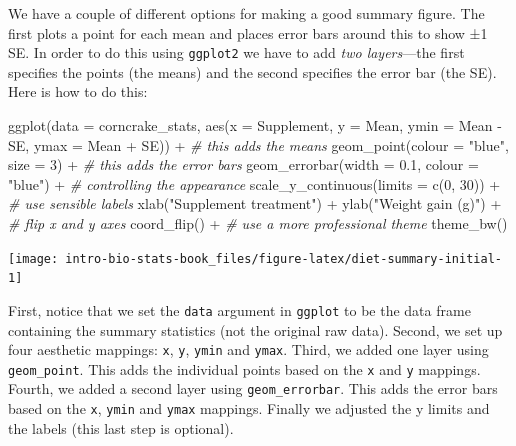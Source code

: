 \documentclass[
]{book}
\newenvironment{Shaded}{\begin{snugshade}}{\end{snugshade}}
\newcommand{\AttributeTok}[1]{\textcolor[rgb]{0.77,0.63,0.00}{#1}}
\newcommand{\CommentTok}[1]{\textcolor[rgb]{0.56,0.35,0.01}{\textit{#1}}}
\newcommand{\DecValTok}[1]{\textcolor[rgb]{0.00,0.00,0.81}{#1}}
\newcommand{\FloatTok}[1]{\textcolor[rgb]{0.00,0.00,0.81}{#1}}
\newcommand{\FunctionTok}[1]{\textcolor[rgb]{0.00,0.00,0.00}{#1}}
\newcommand{\NormalTok}[1]{#1}
\newcommand{\SpecialCharTok}[1]{\textcolor[rgb]{0.00,0.00,0.00}{#1}}
\newcommand{\StringTok}[1]{\textcolor[rgb]{0.31,0.60,0.02}{#1}}
\begin{document}
We have a couple of different options for making a good summary figure. The first plots a point for each mean and places error bars around this to show ±1 SE. In order to do this using \texttt{ggplot2} we have to add \emph{two layers}---the first specifies the points (the means) and the second specifies the error bar (the SE). Here is how to do this:

\begin{Shaded}
\begin{Highlighting}[]
\FunctionTok{ggplot}\NormalTok{(}\AttributeTok{data =}\NormalTok{ corncrake\_stats, }
       \FunctionTok{aes}\NormalTok{(}\AttributeTok{x =}\NormalTok{ Supplement, }\AttributeTok{y =}\NormalTok{ Mean, }\AttributeTok{ymin =}\NormalTok{ Mean }\SpecialCharTok{{-}}\NormalTok{ SE, }\AttributeTok{ymax =}\NormalTok{ Mean }\SpecialCharTok{+}\NormalTok{ SE)) }\SpecialCharTok{+} 
  \CommentTok{\# this adds the means}
  \FunctionTok{geom\_point}\NormalTok{(}\AttributeTok{colour =} \StringTok{"blue"}\NormalTok{, }\AttributeTok{size =} \DecValTok{3}\NormalTok{) }\SpecialCharTok{+} 
  \CommentTok{\# this adds the error bars}
  \FunctionTok{geom\_errorbar}\NormalTok{(}\AttributeTok{width =} \FloatTok{0.1}\NormalTok{, }\AttributeTok{colour =} \StringTok{"blue"}\NormalTok{) }\SpecialCharTok{+} 
  \CommentTok{\# controlling the appearance}
  \FunctionTok{scale\_y\_continuous}\NormalTok{(}\AttributeTok{limits =} \FunctionTok{c}\NormalTok{(}\DecValTok{0}\NormalTok{, }\DecValTok{30}\NormalTok{)) }\SpecialCharTok{+} 
  \CommentTok{\# use sensible labels}
  \FunctionTok{xlab}\NormalTok{(}\StringTok{"Supplement treatment"}\NormalTok{) }\SpecialCharTok{+} \FunctionTok{ylab}\NormalTok{(}\StringTok{"Weight gain (g)"}\NormalTok{) }\SpecialCharTok{+}
  \CommentTok{\# flip x and y axes}
  \FunctionTok{coord\_flip}\NormalTok{() }\SpecialCharTok{+}
  \CommentTok{\# use a more professional theme}
  \FunctionTok{theme\_bw}\NormalTok{()}
\end{Highlighting}
\end{Shaded}

\begin{center}\texttt{[image: intro-bio-stats-book\_files/figure-latex/diet-summary-initial-1]} \end{center}

First, notice that we set the \texttt{data} argument in \texttt{ggplot} to be the data frame containing the summary statistics (not the original raw data). Second, we set up four aesthetic mappings: \texttt{x}, \texttt{y}, \texttt{ymin} and \texttt{ymax}. Third, we added one layer using \texttt{geom\_point}. This adds the individual points based on the \texttt{x} and \texttt{y} mappings. Fourth, we added a second layer using \texttt{geom\_errorbar}. This adds the error bars based on the \texttt{x}, \texttt{ymin} and \texttt{ymax} mappings. Finally we adjusted the y limits and the labels (this last step is optional).
\end{document}

